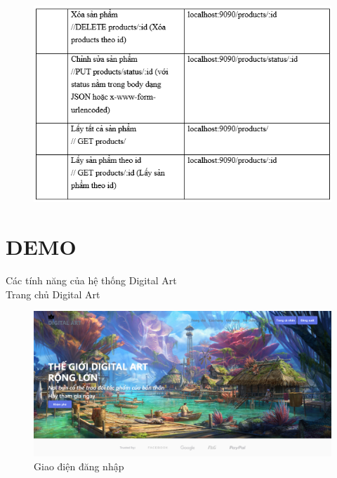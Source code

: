 \documentclass{article}
\begin{document}
{{{{{{{{{{{{{{{{{{\begin{center}
\begin{figure}[htp]
			
		\end{figure}
	\end{center}
}
\newpage
{\large 
	\begin{center}
		\begin{figure}[htp]
			\begin{center}
				\includegraphics[scale=.900]{anh50.png}
			\end{center}
			
			
		\end{figure}
	\end{center}
}
\newpage
\section{DEMO}
\label{sec:Demo}
{\large Các tính năng của hệ thống Digital Art\\
	\indent	Trang chủ Digital Art\\
	\begin{center}
		\begin{figure}[htp]
			\begin{center}
				\includegraphics[scale=.350]{anh30.png}
			\end{center}
			\caption{Giao điện đăng nhập}
			

\end{figure}
\end{center}}}}}}}}}}}}}}}}}}}
\end{document}
